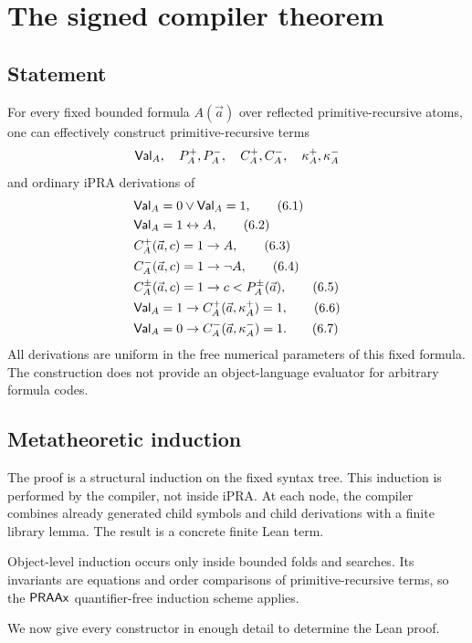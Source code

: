 \section{The signed compiler theorem}

\subsection{Statement}

\begin{theorem}
For every fixed bounded formula \(A(\vec a)\) over reflected primitive-recursive
atoms, one can effectively construct primitive-recursive terms
\[
 \mathsf{Val}_A,\quad P_A^+,P_A^-,\quad C_A^+,C_A^-,
 \quad \kappa_A^+,\kappa_A^-
\]
and ordinary iPRA derivations of
\begin{align}
 &\mathsf{Val}_A=0\vee\mathsf{Val}_A=1, \tag{6.1}\\
 &\mathsf{Val}_A=1\leftrightarrow A, \tag{6.2}\\
 &C_A^+(\vec a,c)=1\to A, \tag{6.3}\\
 &C_A^-(\vec a,c)=1\to\neg A, \tag{6.4}\\
 &C_A^\pm(\vec a,c)=1\to c<P_A^\pm(\vec a), \tag{6.5}\\
 &\mathsf{Val}_A=1\to C_A^+(\vec a,\kappa_A^+)=1, \tag{6.6}\\
 &\mathsf{Val}_A=0\to C_A^-(\vec a,\kappa_A^-)=1. \tag{6.7}
\end{align}
All derivations are uniform in the free numerical parameters of this fixed
formula.  The construction does not provide an object-language evaluator for
arbitrary formula codes.
\end{theorem}

\subsection{Metatheoretic induction}

The proof is a structural induction on the fixed syntax tree.  This induction
is performed by the compiler, not inside iPRA.  At each node, the compiler
combines already generated child symbols and child derivations with a finite
library lemma.  The result is a concrete finite Lean term.

Object-level induction occurs only inside bounded folds and searches.  Its
invariants are equations and order comparisons of primitive-recursive terms,
so the \(\mathsf{PRAAx}\) quantifier-free induction scheme applies.

We now give every constructor in enough detail to determine the Lean proof.

